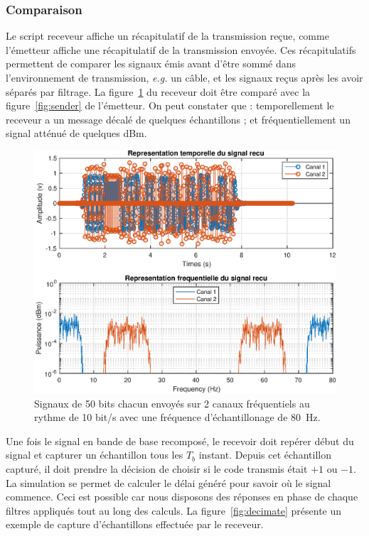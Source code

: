 \documentclass[10pt, oneside, a4paper]{article}
\begin{document}
\subsubsection{Comparaison}
Le script receveur affiche un récapitulatif de la transmission reçue, comme l'émetteur affiche une récapitulatif de la transmission envoyée.
Ces récapitulatifs permettent de comparer les signaux émis avant d'être sommé dans l'environnement de transmission, \textit{e.g.} un câble, et les signaux reçus après les avoir séparés par filtrage.
La figure~\ref{fig:receiver} du receveur doit être comparé avec la figure~\ref{fig:sender} de l'émetteur.
On peut constater que : temporellement le receveur a un message décalé de quelques échantillons ; et fréquentiellement un signal atténué de quelques dBm.

\begin{figure}[p]
    \centering
    \includegraphics[height=0.45\textheight]{eps/receiver.eps}
    \caption{Signaux de 50 bits chacun envoyés sur 2 canaux fréquentiels au rythme de 10 bit/s
             avec une fréquence d'échantillonage de \SI{80}{\hertz}.}
    \label{fig:receiver}
\end{figure}

Une fois le signal en bande de base recomposé, le recevoir doit repérer début du signal et capturer un échantillon tous les $T_b$ instant.
Depuis cet échantillon capturé, il doit prendre la décision de choisir si le code transmis était $+1$ ou $-1$.
La simulation se permet de calculer le délai généré pour savoir où le signal commence.
Ceci est possible car nous disposons des réponses en phase de chaque filtres appliqués tout au long des calculs.
La figure~\ref{fig:decimate} présente un exemple de capture d'échantillons effectuée par le receveur.
\end{document}
